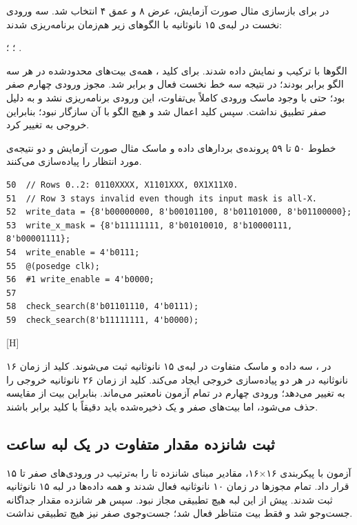 در  برای بازسازی مثال صورت آزمایش، عرض ۸ و عمق ۴ انتخاب
شد. سه ورودی نخست در لبه‌ی ۱۵ نانوثانیه با الگوهای زیر هم‌زمان برنامه‌ریزی شدند:

 ؛
 ؛
 .

الگوها با ترکیب  و  نمایش داده شدند. برای کلید
، همه‌ی بیت‌های محدودشده در هر سه الگو برابر بودند؛ در نتیجه سه خط نخست
فعال و  برابر  شد. مجوز ورودی چهارم صفر بود؛ حتی با
وجود ماسک ورودی کاملاً بی‌تفاوت، این ورودی برنامه‌ریزی نشد و به دلیل  صفر
تطبیق نداشت. سپس کلید  اعمال شد و هیچ الگو با آن سازگار نبود؛
بنابراین خروجی به  تغییر کرد.

خطوط ۵۰ تا ۵۹ پرونده‌ی  بردارهای داده و ماسک مثال صورت
آزمایش و دو نتیجه‌ی مورد انتظار را پیاده‌سازی می‌کنند.

\begin{dsdlcodeblock}
\begin{verbatim}
50  // Rows 0..2: 0110XXXX, X1101XXX, 0X1X11X0.
51  // Row 3 stays invalid even though its input mask is all-X.
52  write_data = {8'b00000000, 8'b00101100, 8'b01101000, 8'b01100000};
53  write_x_mask = {8'b11111111, 8'b01010010, 8'b10000111, 8'b00001111};
54  write_enable = 4'b0111;
55  @(posedge clk);
56  #1 write_enable = 4'b0000;
57
58  check_search(8'b01101110, 4'b0111);
59  check_search(8'b11111111, 4'b0000);
\end{verbatim}
\end{dsdlcodeblock}

[H]

در ، سه داده و ماسک متفاوت در لبه‌ی ۱۵ نانوثانیه
ثبت می‌شوند. کلید  از زمان ۱۶ نانوثانیه در هر دو پیاده‌سازی
خروجی  ایجاد می‌کند. کلید  از زمان ۲۶ نانوثانیه خروجی
را به  تغییر می‌دهد؛ ورودی چهارم در تمام آزمون نامعتبر می‌ماند.
بنابراین بیت  از مقایسه حذف می‌شود، اما بیت‌های صفر و یک ذخیره‌شده
باید دقیقاً با کلید برابر باشند.

\subsection{ثبت شانزده مقدار متفاوت در یک لبه ساعت}

آزمون  با پیکربندی ۱۶×۱۶، مقادیر مبنای شانزده  تا  را به‌ترتیب در ورودی‌های صفر تا ۱۵ قرار داد. تمام مجوزها در زمان ۱۰ نانوثانیه فعال شدند و همه داده‌ها در لبه ۱۵ نانوثانیه ثبت شدند. پیش از این لبه هیچ تطبیقی مجاز نبود. سپس هر شانزده مقدار جداگانه جست‌وجو شد و فقط بیت متناظر فعال شد؛ جست‌وجوی صفر نیز هیچ تطبیقی نداشت.

